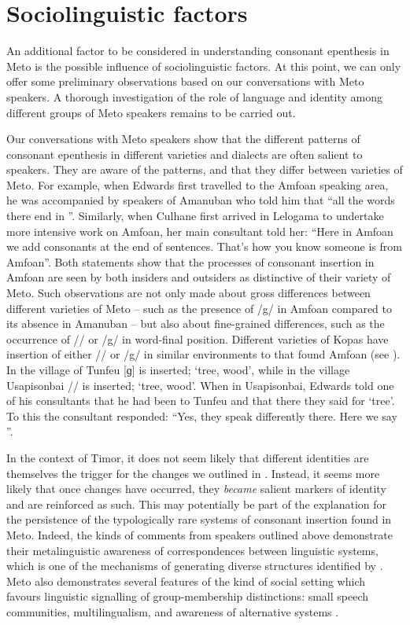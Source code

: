\documentclass[output=paper]{langscibook}
\begin{document}
\section{Sociolinguistic factors}\label{sec:SocioLing}
An additional factor to be considered in understanding consonant epenthesis
in Meto is the possible influence of sociolinguistic factors.
At this point, we can only offer some preliminary observations
based on our conversations with Meto speakers.
A thorough investigation of the role of language
and identity among different groups of Meto speakers
remains to be carried out.

Our conversations with Meto speakers show that the 
different patterns of consonant epenthesis in different varieties
and dialects are often salient to speakers. They are aware
of the patterns, and that they differ between varieties of Meto.
For example, when Edwards first travelled to the Amfo{\Q}an
speaking area, he was accompanied by speakers of Amanuban
who told him that ``all the words there end in ''. 
Similarly, when Culhane first arrived in Lelogama
to undertake more intensive work on Amfo{\Q}an, her
main consultant told her: ``Here in Amfo{\Q}an we
add consonants at the end of sentences.
That's how you know someone is from Amfo{\Q}an''.
Both statements show that the processes of consonant
insertion in Amfo{\Q}an are seen by both insiders
and outsiders as distinctive of their variety of Meto. 
Such observations are not only made about gross differences
between different varieties of Meto -- such as the presence of /g/
in Amfo{\Q}an compared to its absence in Amanuban -- but also about fine-grained differences, such
as the occurrence of /\gw/ or /g/ in word-final position.
Different varieties of Kopas have insertion of either /\gw/ or /g/ in
similar environments to that found Amfo{\Q}an (see ).
In the village of Tunfe{\Q}u [ɡ] is inserted;  {\ra}  `tree, wood',
while in the village Usapisonba{\Q}i  /\gw/ is inserted;  {\ra}  `tree, wood'.
When in Usapisonba{\Q}i, Edwards told 
one of his consultants that he had been to Tunfe{\Q}u
and that there they said  for `tree'.
To this the consultant responded:
``Yes, they speak differently there.
Here we say ''.

In the context of Timor, it does not seem likely
that different identities are themselves the trigger
for the changes we outlined in .
Instead, it seems more likely that once 
changes have occurred, they \emph{became}
salient markers of identity and are reinforced as such.
This may potentially be part of the explanation for
the persistence of the typologically rare systems
of consonant insertion found in Meto.
Indeed, the kinds of comments from speakers outlined above 
demonstrate their metalinguistic awareness of correspondences
between linguistic systems,
which is one of the mechanisms of generating diverse
structures identified by \citet{ev19}.
Meto also demonstrates several 
features of the kind of social setting which 
favours linguistic signalling of group-membership distinctions:  
small speech communities, multilingualism, and 
awareness of alternative systems \citep[582--584]{ev19}.
\end{document}
